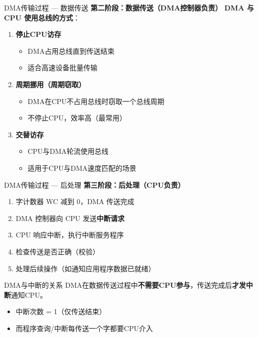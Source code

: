 \documentclass[10pt, aspectratio=169]{beamer}
\begin{document}
\begin{frame}{DMA传输过程 --- 数据传送}
    \textbf{第二阶段：数据传送（DMA控制器负责）}
    \vspace{0.3em}
    \textbf{DMA 与 CPU 使用总线的方式}：
    \vspace{0.3em}
    \begin{enumerate}
        \item \textbf{停止CPU访存}
            \begin{itemize}
                \item DMA占用总线直到传送结束
                \item 适合高速设备批量传输
            \end{itemize}
        \item \textbf{周期挪用（周期窃取）}
            \begin{itemize}
                \item DMA在CPU不占用总线时窃取一个总线周期
                \item 不停止CPU，效率高（最常用）
            \end{itemize}
        \item \textbf{交替访存}
            \begin{itemize}
                \item CPU与DMA轮流使用总线
                \item 适用于CPU与DMA速度匹配的场景
            \end{itemize}
    \end{enumerate}
\end{frame}

\begin{frame}{DMA传输过程 --- 后处理}
    \textbf{第三阶段：后处理（CPU负责）}
    \vspace{0.3em}
    \begin{enumerate}
        \item 字计数器 WC 减到 0，DMA 传送完成
        \item DMA 控制器向 CPU 发送\textbf{中断请求}
        \item CPU 响应中断，执行中断服务程序
        \item 检查传送是否正确（校验）
        \item 处理后续操作（如通知应用程序数据已就绪）
    \end{enumerate}
    \vspace{0.5em}
    \begin{block}{DMA与中断的关系}
        DMA在数据传送过程中\textbf{不需要CPU参与}，传送完成后\textbf{才发中断}通知CPU。
        \begin{itemize}
            \item 中断次数 = 1（仅传送结束）
            \item 而程序查询/中断每传送一个字都要CPU介入
        \end{itemize}
    \end{block}
\end{frame}
\end{document}
